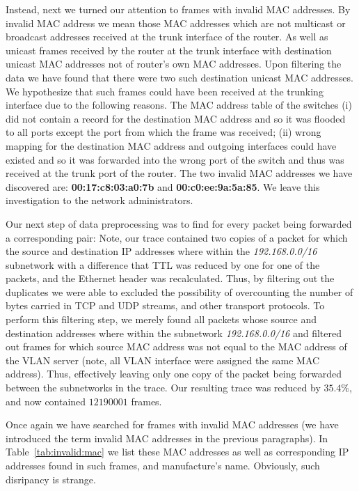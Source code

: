 Instead, next we turned our attention to frames with invalid MAC addresses. 
By invalid MAC address we mean those MAC addresses which are not multicast or 
broadcast addresses received at the trunk interface of the router. As well
as unicast frames received by the router at the trunk interface with 
destination unicast MAC addresses not of router's own MAC addresses. 
Upon filtering the data we have found that there were two such 
destination unicast MAC addresses. We hypothesize that such frames could have been
received at the trunking interface due to the following reasons. The MAC
address table of the switches (i) did not contain a record for the destination 
MAC address and so it was flooded to all ports except the port from which 
the frame was received; (ii) wrong mapping for the destination MAC 
address and outgoing interfaces could have existed and so it was 
forwarded into the wrong port of the switch and thus was received at the 
trunk port of the router. The two invalid MAC addresses we have discovered are: 
{\bf 00:17:c8:03:a0:7b} and {\bf 00:c0:ee:9a:5a:85}. We leave this 
investigation to the network administrators.


Our next step of data preprocessing was to find for every packet being 
forwarded a corresponding pair: Note, our trace contained two copies 
of a packet for which the source and destination IP addresses where within 
the {\em 192.168.0.0/16} subnetwork with a difference that TTL was reduced 
by one for one of the packets, and the Ethernet header was recalculated. 
Thus, by filtering out the duplicates we were able to excluded the 
possibility of overcounting the number of bytes carried in TCP and 
UDP streams, and other transport protocols. To perform this filtering step, 
we merely found all packets whose source and destination addresses where within 
the subnetwork {\em 192.168.0.0/16} and filtered out frames for which 
source MAC address was not equal to the MAC address of the VLAN server
(note, all VLAN interface were assigned the same MAC address). 
Thus, effectively leaving only one copy of the packet being forwarded 
between the subnetworks in the trace. Our resulting trace was reduced by
$35.4 \%$, and now contained $12190001$ frames.

Once again we have searched for frames with invalid MAC
addresses (we have introduced the term invalid MAC addresses in the
previous paragraphs). In Table~\ref{tab:invalid:mac} we list these
MAC addresses as well as corresponding IP addresses found in such
frames, and manufacture's name. Obviously, such disripancy is strange.


